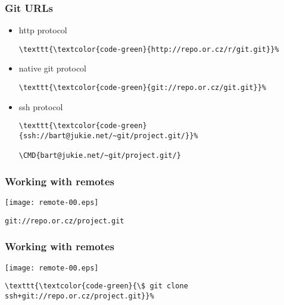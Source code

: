 \documentclass[english]{beamer}
\newcommand{\CMD}[1]{%
\texttt{\textcolor{code-green}{#1}}%
}
\begin{document}
\begin{frame}[fragile]
\frametitle{Git URLs}

\begin{itemize}
        \item http protocol \\
                \begin{Verbatim}[commandchars=\\\{\}]
\CMD{http://repo.or.cz/r/git.git}
                \end{Verbatim}
                \vspace{\baselineskip}
                \pause{}

        \item native git protocol
                \begin{Verbatim}[commandchars=\\\{\}]
\CMD{git://repo.or.cz/git.git}
                \end{Verbatim}
                \vspace{\baselineskip}
                \pause{}

        \item ssh protocol
                \begin{Verbatim}[commandchars=\\\{\}]
\CMD{ssh://bart@jukie.net/~git/project.git/}
\CMD{bart@jukie.net/~git/project.git/}
                \end{Verbatim}
\end{itemize}
\end{frame}

\begin{frame}
\frametitle{Working with remotes}

\texttt{[image: remote-00.eps]}

\begin{center}
\CMD{git://repo.or.cz/project.git}
\end{center}
\vspace{\textheight}
\end{frame}

\begin{frame}[fragile]
\frametitle{Working with remotes}

\texttt{[image: remote-00.eps]}

\begin{Verbatim}[commandchars=\\\{\}]
\CMD{\$ git clone ssh+git://repo.or.cz/project.git}
\end{Verbatim}
\vspace{\textheight}
\end{frame}
\end{document}
